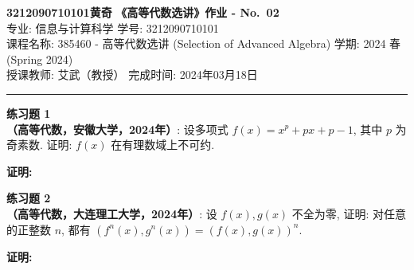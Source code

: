 \documentclass[a4paper, 11pt]{article}
\newenvironment{problem}[2][练习题]
    { \begin{mdframed}[backgroundcolor=gray!5] \textbf{#1 #2} \\}
    {  \end{mdframed}}
\newenvironment{solution2}
    {\textbf{证明:}}
    {}
\begin{document}
\noindent
\large\textbf{3212090710101\quad 黄奇} \hfill \textbf{《高等代数选讲》作业 - No.~\Huge{02}}   \\
专业: 信息与计算科学 \hfill 学号: 3212090710101 \\
\normalsize 课程名称: 385460 - 高等代数选讲 (Selection of Advanced Algebra) \hfill 学期: 2024 春 (Spring 2024)\\
授课教师: 艾武（教授） \hfill 完成时间: 2024年03月18日 \\
\noindent\rule{7in}{1.8pt}

\begin{problem}{1}
\textbf{（高等代数，安徽大学，2024年）}: 设多项式 $f(x)=x^p+p x+p-1$, 其中 $p$ 为奇素数. 证明: $f(x)$ 在有理数域上不可约.
\end{problem}

\begin{solution2}

\end{solution2} 


\begin{problem}{2}
\textbf{（高等代数，大连理工大学，2024年）}: 设 $f(x), g(x)$ 不全为零, 证明: 对任意的正整数 $n$, 都有 $\left(f^n(x), g^n(x)\right)=(f(x), g(x))^n$.
\end{problem}

\begin{solution2}

\end{solution2} 





\end{document}
